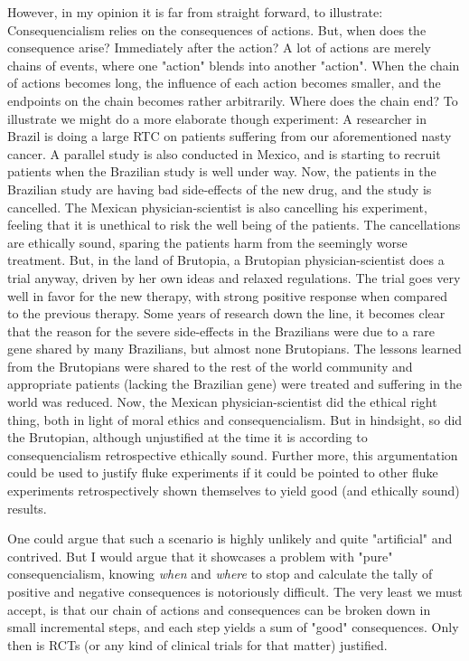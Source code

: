 \documentclass[12p]{article}
\begin{document}
However, in my opinion it is far from straight forward, to illustrate:
Consequencialism relies on the consequences of actions.
But, when does the consequence arise?
Immediately after the action?
A lot of actions are merely chains of events, where one "action" blends into another "action".
When the chain of actions becomes long, the influence of each action becomes smaller, and the endpoints on the chain becomes rather arbitrarily.
Where does the chain end?
To illustrate we might do a more elaborate though experiment:
A researcher in Brazil is doing a large RTC on patients suffering from our aforementioned nasty cancer.
A parallel study is also conducted in Mexico, and is starting to recruit patients when the Brazilian study is well under way.
Now, the patients in the Brazilian study are having bad side-effects of the new drug, and the study is cancelled.
The Mexican physician-scientist is also cancelling his experiment, feeling that it is unethical to risk the well being of the patients.
The cancellations are ethically sound, sparing the patients harm from the seemingly worse treatment.
But, in the land of  Brutopia, a Brutopian physician-scientist does a trial anyway, driven by her own ideas and relaxed regulations.
The trial goes very well in favor for the new therapy, with strong positive response when compared to the previous therapy.
Some years of research down the line, it becomes clear that the reason for the severe side-effects in the Brazilians were due to a rare gene shared by many Brazilians, but almost none Brutopians.
The lessons learned from the Brutopians were shared to the rest of the world community and appropriate patients (lacking the Brazilian gene) were treated and suffering in the world was reduced.
Now, the Mexican physician-scientist did the ethical right thing, both in light of moral ethics and consequencialism.
But in hindsight, so did the Brutopian, although unjustified at the time it is according to consequencialism retrospective ethically sound.
Further more, this argumentation could be used to justify fluke experiments if it could be pointed to other fluke experiments retrospectively shown themselves to yield good (and ethically sound) results.

One could argue that such a scenario is highly unlikely and quite "artificial" and contrived. %
But I would argue that it showcases a problem with "pure" consequencialism, knowing \emph{when} and \emph{where} to stop and calculate the tally of positive and negative consequences is notoriously difficult.
The very least we must accept, is that our chain of actions and consequences can be broken down in small incremental steps, and each step yields a sum of "good" consequences.
Only then is RCTs (or any kind of clinical trials for that matter) justified.
\end{document}
